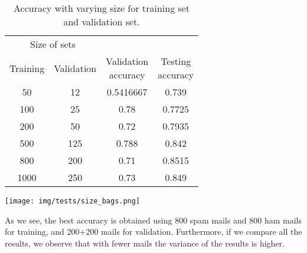 \begin{center}
\begin{table}[h]
\begin{minipage}{.5\linewidth}
\begin{tabular}{cccc}
\toprule
\multicolumn{2}{c}{Size of sets} \\
\cmidrule(r){1-2}
Training & Validation & \shortstack{Validation\\ accuracy} & \shortstack{Testing\\ accuracy}\\
\midrule
50   & 12     & 0.5416667 & 0.739\\
100  & 25     & 0.78 & 0.7725 \\
200  & 50     & 0.72 & 0.7935 \\
500  & 125    & 0.788 & 0.842 \\
800  & 200    & 0.71 & 0.8515 \\
1000 & 250    & 0.73 & 0.849 \\
\bottomrule
\end{tabular}
\end{minipage}
\begin{minipage}{.5\linewidth}
\texttt{[image: img/tests/size\_bags.png]}
    \label{fig:sizebags}
\end{minipage}
\caption{Accuracy with varying size for training set and validation set.}
\end{table}
\label{tab:sizebags}
\end{center}

As we see, the best accuracy is obtained using 800 spam mails and 800 ham mails for training, and 200+200 mails for validation. Furthermore, if we compare all the results, we observe that with fewer mails the variance of the results is higher.

